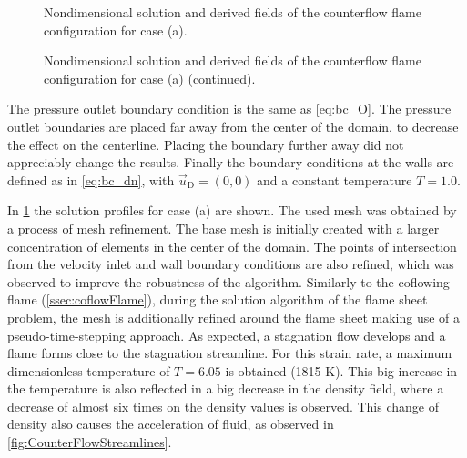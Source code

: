 \begin{figure}[p]
	\centering
	\pgfplotsset{width=0.73\textwidth, compat=1.3}
	\caption{Nondimensional solution and derived fields of the counterflow flame configuration for case (a).} \label{fig:CounterFlowFlameFig1}
\end{figure}
\begin{figure}[p]
	\ContinuedFloat
	\centering
	\pgfplotsset{width=0.73\textwidth, compat=1.3}		
	\caption{Nondimensional solution and derived fields of the counterflow flame configuration for case (a) (continued).}%
\end{figure} 


The pressure outlet boundary condition is the same as \cref{eq:bc_O}. The pressure outlet boundaries are placed far away from the center of the domain, to decrease the effect on the centerline. Placing the boundary further away did not appreciably change the results. Finally the boundary conditions at the walls are defined as in \cref{eq:bc_dn}, with $\vec{u}_{\text{D}} = (0,0)$ and a constant temperature $T = 1.0$.          
 
In \cref{fig:CounterFlowFlameFig1} the solution profiles for case (a) are shown. The used mesh was obtained by a process of mesh refinement. The base mesh is initially created with a larger concentration of elements in the center of the domain. The points of intersection from the velocity inlet and wall boundary conditions are also refined, which was observed to improve the robustness of the algorithm. Similarly to the coflowing flame (\cref{ssec:coflowFlame}), during the solution algorithm of the flame sheet problem, the mesh is additionally refined around the flame sheet making use of a pseudo-time-stepping approach.
As expected, a stagnation flow develops and a flame forms close to the stagnation streamline. For this strain rate, a maximum dimensionless temperature of $T = 6.05$ is obtained (1815 $\si{\kelvin}$). This big increase in the temperature is also reflected in a big decrease in the density field, where a decrease of almost six times on the density values is observed. This change of density also causes the acceleration of fluid, as observed in \cref{fig:CounterFlowStreamlines}. 

